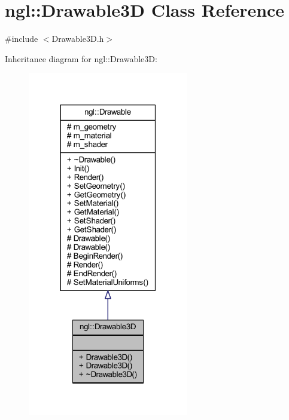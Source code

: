 \hypertarget{classngl_1_1_drawable3_d}{}\section{ngl\+:\+:Drawable3D Class Reference}
\label{classngl_1_1_drawable3_d}


{\ttfamily \#include $<$Drawable3\+D.\+h$>$}



Inheritance diagram for ngl\+:\+:Drawable3D\+:
\nopagebreak
\begin{figure}[H]
\begin{center}
\leavevmode
\includegraphics[width=199pt]{classngl_1_1_drawable3_d__inherit__graph}
\end{center}
\end{figure}


